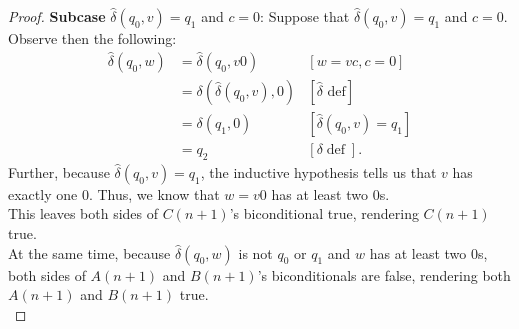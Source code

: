 \documentclass[10pt]{article}
\begin{document}
\begin{enumerate}[label={}]
\begin{proof}
              \textbf{Subcase }$\hat{\delta}\left(q_0, v\right)=q_1$ and $c=0$: Suppose that $\hat{\delta}\left(q_0, v\right)=q_1$ and $c=0$. Observe then the following:
              $$
                  \begin{aligned}
                      \hat{\delta}\left(q_0, w\right) & =\hat{\delta}\left(q_0, v 0\right)                    & {[w=v c, c=0] }                                     \\
                                                      & =\delta\left(\hat{\delta}\left(q_0, v\right),0\right) & {[\hat{\delta} \text { def}] }                      \\
                                                      & =\delta\left(q_1, 0\right)                            & {\left[\hat{\delta}\left(q_0, v\right)=q_1\right] } \\
                                                      & =q_2                                                  & {[\delta \operatorname{def}] . }
                  \end{aligned}
              $$
              Further, because $\hat{\delta}\left(q_0, v\right)=q_1$, the inductive hypothesis tells us that $v$ has exactly one 0. Thus, we know that $w=v0$ has at least two 0s.\\
              This leaves both sides of $C(n+1)$'s biconditional true, rendering $C(n+1)$ true.\\
              At the same time, because $\hat{\delta}\left(q_0, w\right)$ is not $q_0$ or $q_1$ and $w$ has at least two 0s, both sides of $A(n+1)$ and $B(n+1)$'s biconditionals are false, rendering both $A(n+1)$ and $B(n+1)$ true.\\


\end{proof}
\end{enumerate}
\end{document}
